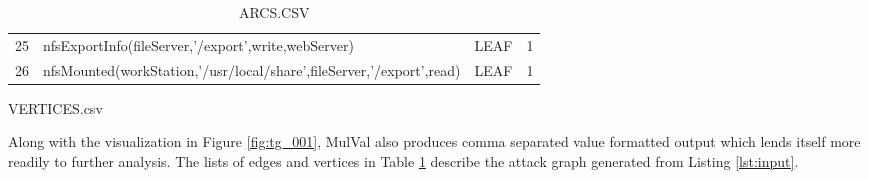 \begin{table}[ht]
\begin{subtable}[t]{0.6\textwidth}
{\begin{tabular}[t]{@{}llll@{}}
25 & nfsExportInfo(fileServer,'/export',write,webServer) & LEAF & 1 \\
26 & nfsMounted(workStation,'/usr/local/share',fileServer,'/export',read) & LEAF & 1 \\ \bottomrule
\end{tabular}%
}
\caption{VERTICES.csv}
\label{tab:eg_verts}
\end{subtable}
\begin{subtable}[t]{0.3\textwidth}
\flushright
{}
\caption{ARCS.CSV}
\label{tab:eg_arcs}
\end{subtable}
    \label{tab:mulval_out}
\end{table}

Along with the visualization in Figure \ref{fig:tg_001}, MulVal also produces comma separated value formatted output which lends itself more readily to further analysis. The lists of edges and vertices in Table \ref{tab:mulval_out} describe the attack graph generated from Listing \ref{lst:input}.